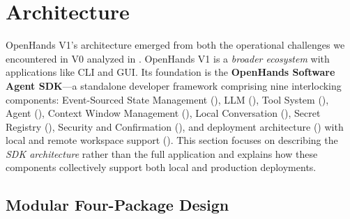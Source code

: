 \section{Architecture}
\label{sec:architecture}


OpenHands V1’s architecture emerged from both the operational challenges we encountered in V0 analyzed in . OpenHands V1 is a \emph{broader ecosystem} with applications like CLI and GUI. Its foundation is the \textbf{OpenHands Software Agent SDK}—a standalone developer framework comprising nine interlocking components: Event-Sourced State Management (), LLM (), Tool System (), Agent (), Context Window Management (), Local Conversation (), Secret Registry (), Security and Confirmation (), and deployment architecture () with local and remote workspace support ().
% 
This section focuses on describing the \emph{SDK architecture} rather than the full application and explains how these components collectively support both local and production deployments.

% 


\subsection{Modular Four-Package Design}
\label{sec:overview}

